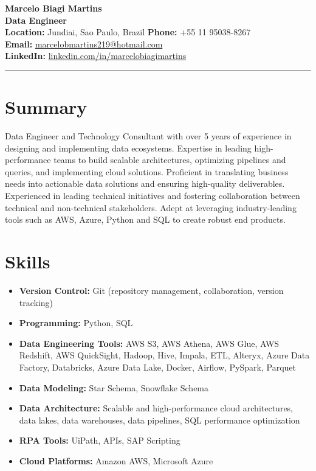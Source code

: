 \documentclass[a4paper,10pt]{article}
\begin{document}
\begin{center}
    {\LARGE \textbf{Marcelo Biagi Martins}} \\
    {\large \textbf{Data Engineer}} \\
    \textbf{Location:} Jundiai, Sao Paulo, Brazil \textbar \hspace{0.1em} \textbf{Phone:} +55 11 95038-8267 \\
    \textbf{Email:} \href{mailto:marcelobmartins219@hotmail.com}{marcelobmartins219@hotmail.com} \\
    \textbf{LinkedIn:} \href{https://www.linkedin.com/in/marcelo-biagi-martins-aa5a7616b/}{linkedin.com/in/marcelobiagimartins} \\
\end{center}

\hrule
\vspace{1em}

\section*{Summary}
Data Engineer and Technology Consultant with over 5 years of experience in designing and implementing data ecosystems. %
Expertise in leading high-performance teams to build scalable architectures, optimizing pipelines and queries, and implementing cloud solutions. %
Proficient in translating business needs into actionable data solutions and ensuring high-quality deliverables. Experienced in leading technical initiatives %
and fostering collaboration between technical and non-technical stakeholders. Adept at leveraging industry-leading tools such as AWS, Azure, Python and SQL to create robust end products.

\section*{Skills}
\begin{itemize}[leftmargin=*]
    \item \textbf{Version Control:} Git (repository management, collaboration, version tracking)
    \item \textbf{Programming:} Python, SQL
    \item \textbf{Data Engineering Tools:} AWS S3, AWS Athena, AWS Glue, AWS Redshift, AWS QuickSight, Hadoop, Hive, Impala, ETL, Alteryx, Azure Data Factory, Databricks, Azure Data Lake, Docker, Airflow, PySpark, Parquet
    \item \textbf{Data Modeling:} Star Schema, Snowflake Schema
    \item \textbf{Data Architecture:} Scalable and high-performance cloud architectures, data lakes, data warehouses, data pipelines, SQL performance optimization
    \item \textbf{RPA Tools:} UiPath, APIs, SAP Scripting
    \item \textbf{Cloud Platforms:} Amazon AWS, Microsoft Azure
\end{itemize}
\end{document}
